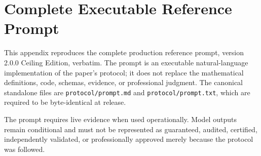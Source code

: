 \section{Complete Executable Reference Prompt}
\label{app:prompt}

This appendix reproduces the complete production reference prompt, version 2.0.0 Ceiling Edition, verbatim. The prompt is an executable natural-language implementation of the paper's protocol; it does not replace the mathematical definitions, code, schemas, evidence, or professional judgment. The canonical standalone files are \texttt{protocol/prompt.md} and \texttt{protocol/prompt.txt}, which are required to be byte-identical at release.

\begin{warningbox}
The prompt requires live evidence when used operationally. Model outputs remain conditional and must not be represented as guaranteed, audited, certified, independently validated, or professionally approved merely because the protocol was followed.
\end{warningbox}

\VerbatimInput[fontsize=\tiny,breaklines=true,breakanywhere=true,frame=single,framesep=2mm,rulecolor=\color{FWLine}]{\ProtocolPath}
